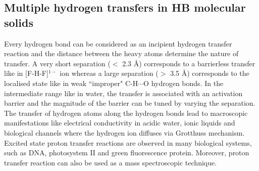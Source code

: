 \subsection{Multiple hydrogen transfers in HB molecular solids}

\noindent Every hydrogen bond can be considered as an incipient hydrogen transfer reaction and the distance between the heavy atoms determine the nature of transfer. A very short separation ($<$ 2.3 \AA{}) corresponds to a barrierless transfer like in [F-H-F]$^{1-}$ ion\cite{dereka2021crossover} whereas a large separation ($>$ 3.5 \AA{}) corresponds to the localised state like in weak ``improper" C-H$\cdots$O hydrogen bonds\cite{desiraju2001weak}. In the intermediate range like in water, the transfer is associated with an activation barrier and the magnitude of the barrier can be tuned by varying the separation. The transfer of hydrogen atoms along the hydrogen bonds lead to macroscopic manifestations like electrical conductivity in acidic water, ionic liquids and biological channels where the hydrogen ion diffuses via Grotthuss mechanism. Excited state proton transfer reactions\cite{zhou2018unraveling} are observed in many biological systems, such as DNA, photosystem II and green fluorescence protein. Moreover, proton transfer reaction can also be used as a mass spectroscopic technique\cite{blake2009proton}. 

